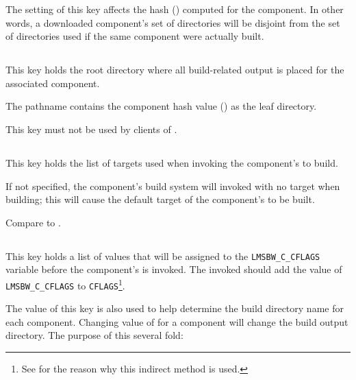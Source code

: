 The setting of this key affects the hash ()
computed for the component.  In other words, a downloaded component's
set of directories will be disjoint from the set of directories used
if the same component were actually built.


\subsection{}\label{variables:build-root-directory}

This key holds the root directory where all build-related output is
placed for the associated component.

The pathname contains the component hash value ()
as the leaf directory.

This key must not be used by clients of \lmsbw.


\subsection{}\label{variables:build-target}

This key holds the list of targets used when invoking the component's
\makefile to build.

If not specified, the component's build system will invoked with no
target when building; this will cause the default target of the
component's \makefile to be built.

Compare to .


\subsection{}\label{variables:cflags}

This key holds a list of values that will be assigned to the
\texttt{LMSBW\_C\_CFLAGS} variable before the component's \makefile is
invoked.  The invoked \makefile should add the value of
\texttt{LMSBW\_C\_CFLAGS} to \texttt{CFLAGS}\footnote{See
   for the reason why this indirect method is used.}.

The value of this key is also used to help determine the build
directory name for each component.  Changing value of
 for a component will change the build
output directory. The purpose of this several fold:

